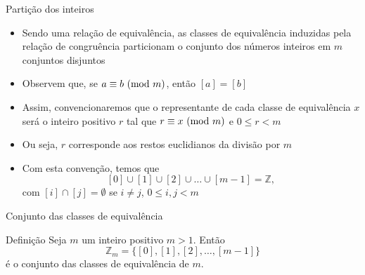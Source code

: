 \begin{frame}[fragile]{Partição dos inteiros}

    \begin{itemize}
        \item Sendo uma relação de equivalência, as classes de equivalência induzidas pela
            relação de congruência particionam o conjunto dos números inteiros em $m$
            conjuntos disjuntos

        \item Observem que, se $a\equiv b\ (\mbox{mod}\ m)$, então $[a] = [b]$

        \item Assim, convencionaremos que o representante de cada classe de equivalência
            $x$ será o inteiro positivo $r$ tal que $r\equiv x\ (\mbox{mod}\ m)$ e $0\leq r< m$

        \item Ou seja, $r$ corresponde aos restos euclidianos da divisão por $m$

        \item Com esta convenção, temos que
        $$
            [0] \cup [1] \cup [2] \cup \ldots \cup [m - 1] = \mathbb{Z},
        $$
        com $[i]\cap [j] = \emptyset$ se $i\neq j$, $0\leq i, j < m$
    \end{itemize}

\end{frame}

\begin{frame}[fragile]{Conjunto das classes de equivalência}

    \begin{block}{Definição}
        Seja $m$ um inteiro positivo $m > 1$. Então
        $$
            \mathbb{Z}_m = \{ [0], [1], [2], \ldots, [m - 1]\}
        $$
        é o conjunto das classes de equivalência de $m$.
    \end{block}

\end{frame}

